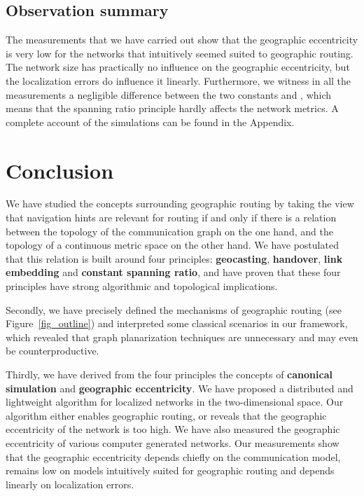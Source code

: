 \documentclass{article}
\begin{document}
\subsection{Observation summary}

The measurements that we have carried out show that the geographic eccentricity is very low for the networks that intuitively seemed suited to geographic routing. The network size has practically no influence on the geographic eccentricity, but the localization errors do influence it linearly.
 Furthermore, we witness in all the measurements
a negligible difference between the two constants  and , which means that the spanning ratio principle hardly affects the network metrics. 
A complete account of the simulations can be found in the Appendix.

\section{Conclusion}

We have studied the concepts surrounding geographic routing by taking the view that navigation hints are relevant for routing if and only if there is a relation between the topology of the communication graph on the one hand, and the topology of a continuous metric space on the other hand. We have postulated that this relation is built around four principles: {\bf geocasting}, {\bf handover}, {\bf link embedding} and {\bf constant spanning ratio}, and have proven that these four principles have strong algorithmic and topological implications.

Secondly, we have precisely defined the mechanisms of geographic routing (see Figure~\ref{fig_outline}) and interpreted some classical scenarios in our framework, which revealed that graph planarization techniques are unnecessary and may even be counterproductive.

Thirdly, we have derived from the four principles the concepts of {\bf canonical simulation} and {\bf geographic eccentricity}. We have proposed a distributed and lightweight algorithm for localized networks in the two-dimensional space. Our algorithm either enables geographic routing, or reveals that the geographic eccentricity of the network is too high. We have also measured the geographic eccentricity of various computer generated networks. Our measurements show that the geographic eccentricity depends chiefly on the communication model, remains low on models intuitively suited for geographic routing and depends linearly on localization errors.
\end{document}
